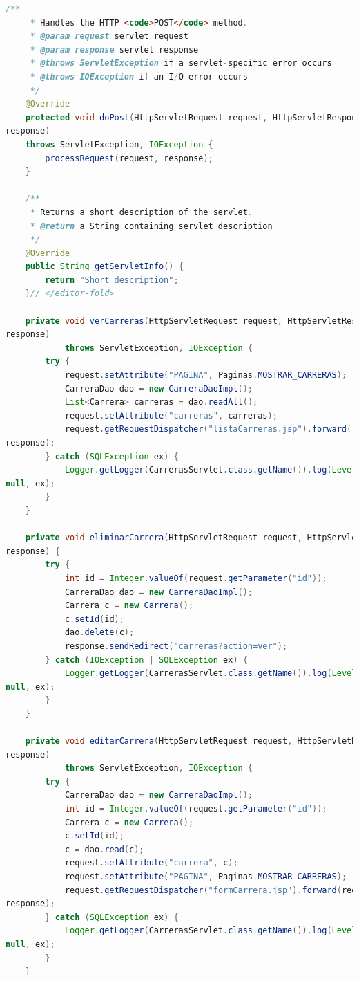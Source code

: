 \documentclass[a4paper,12pt]{article}
\begin{document}
\begin{lstlisting}[language=Java, style=customJava, 
caption={CarrerasServlet.java}, captionpos=b,basicstyle=\fontfamily{cmss}\small]
    /** 
     * Handles the HTTP <code>POST</code> method.
     * @param request servlet request
     * @param response servlet response
     * @throws ServletException if a servlet-specific error occurs
     * @throws IOException if an I/O error occurs
     */
    @Override
    protected void doPost(HttpServletRequest request, HttpServletResponse 
response)
    throws ServletException, IOException {
        processRequest(request, response);
    }

    /** 
     * Returns a short description of the servlet.
     * @return a String containing servlet description
     */
    @Override
    public String getServletInfo() {
        return "Short description";
    }// </editor-fold>

    private void verCarreras(HttpServletRequest request, HttpServletResponse 
response) 
            throws ServletException, IOException {
        try {
            request.setAttribute("PAGINA", Paginas.MOSTRAR_CARRERAS);
            CarreraDao dao = new CarreraDaoImpl();
            List<Carrera> carreras = dao.readAll();
            request.setAttribute("carreras", carreras);
            request.getRequestDispatcher("listaCarreras.jsp").forward(request, 
response);
        } catch (SQLException ex) {
            Logger.getLogger(CarrerasServlet.class.getName()).log(Level.SEVERE, 
null, ex);
        }
    }

    private void eliminarCarrera(HttpServletRequest request, HttpServletResponse 
response) {
        try {
            int id = Integer.valueOf(request.getParameter("id"));
            CarreraDao dao = new CarreraDaoImpl();
            Carrera c = new Carrera();
            c.setId(id);
            dao.delete(c);
            response.sendRedirect("carreras?action=ver");
        } catch (IOException | SQLException ex) {
            Logger.getLogger(CarrerasServlet.class.getName()).log(Level.SEVERE, 
null, ex);
        }
    }

    private void editarCarrera(HttpServletRequest request, HttpServletResponse 
response) 
            throws ServletException, IOException {
        try {
            CarreraDao dao = new CarreraDaoImpl();
            int id = Integer.valueOf(request.getParameter("id"));
            Carrera c = new Carrera();
            c.setId(id);
            c = dao.read(c);
            request.setAttribute("carrera", c);
            request.setAttribute("PAGINA", Paginas.MOSTRAR_CARRERAS);
            request.getRequestDispatcher("formCarrera.jsp").forward(request, 
response);
        } catch (SQLException ex) {
            Logger.getLogger(CarrerasServlet.class.getName()).log(Level.SEVERE, 
null, ex);
        }
    }


\end{lstlisting}
\end{document}
